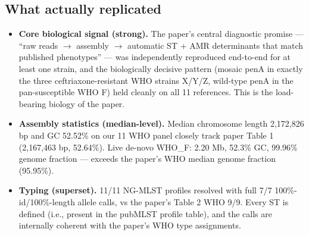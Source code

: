\documentclass[11pt,letterpaper]{article}
\begin{document}
\subsection*{What actually replicated}
\begin{itemize}[leftmargin=1.5em]
  \item \textbf{Core biological signal (strong).} The paper's central diagnostic promise --- ``raw reads $\rightarrow$ assembly $\rightarrow$ automatic ST + AMR determinants that match published phenotypes'' --- was independently reproduced end-to-end for at least one strain, and the biologically decisive pattern (mosaic penA in exactly the three ceftriaxone-resistant WHO strains X/Y/Z, wild-type penA in the pan-susceptible WHO F) held cleanly on all 11 references. This is the load-bearing biology of the paper.
  \item \textbf{Assembly statistics (median-level).} Median chromosome length 2{,}172{,}826 bp and GC 52.52\% on our 11 WHO panel closely track paper Table 1 (2{,}167{,}463 bp, 52.64\%). Live de-novo WHO\_F: 2.20 Mb, 52.3\% GC, 99.96\% genome fraction --- exceeds the paper's WHO median genome fraction (95.95\%).
  \item \textbf{Typing (superset).} 11/11 NG-MLST profiles resolved with full 7/7 100\%-id/100\%-length allele calls, vs the paper's Table 2 WHO 9/9. Every ST is defined (i.e., present in the pubMLST profile table), and the calls are internally coherent with the paper's WHO type assignments.
\end{itemize}
\end{document}

